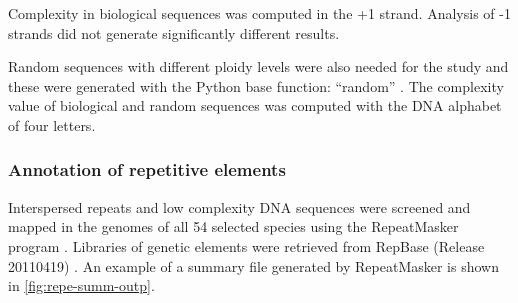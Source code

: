 Complexity in biological sequences was computed in the +1 strand. Analysis of -1 strands did not generate significantly different results.

Random sequences with different ploidy levels were also needed for the study and these were generated with the Python base function: ``random'' \cite{VanRossum2003}. The complexity value of biological and random sequences was computed with the DNA alphabet of four letters.

\subsubsection{Annotation of repetitive elements}
\label{sec:annot-repet-elem}

Interspersed repeats and low complexity DNA sequences were screened and mapped in the genomes of all 54 selected species using the RepeatMasker program \cite{Smit2010}. Libraries of genetic elements were retrieved from RepBase (Release 20110419) \cite{Jurka2005}. An example of a summary file generated by RepeatMasker is shown in  \autoref{fig:repe-summ-outp}.

